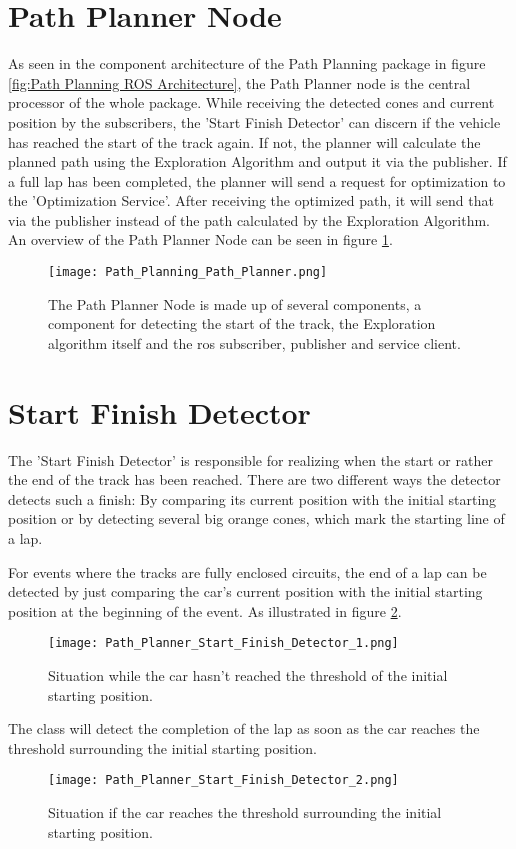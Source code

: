 \section{Path Planner Node} \label{sec:Path Planner Node}
As seen in the component architecture of the Path Planning package in figure \ref{fig:Path Planning ROS Architecture}, the Path Planner node is the central processor of the whole package.
While receiving the detected cones and current position by the subscribers, the 'Start Finish Detector' can discern if the vehicle has reached the start of the track again. If not, the planner will calculate the planned path using the Exploration Algorithm and output it via the publisher. If a full lap has been completed, the planner will send a request for optimization to the 'Optimization Service'. After receiving the optimized path, it will send that via the publisher instead of the path calculated by the Exploration Algorithm. An overview of the Path Planner Node can be seen in figure \ref{fig:Path Planning Path Planner Node}.
\begin{figure}[H]
    \centering
    \texttt{[image: Path\_Planning\_Path\_Planner.png]}
    \caption{The Path Planner Node is made up of several components, a component for detecting the start of the track, the Exploration algorithm itself and the \acrshort{ros} subscriber, publisher and service client.}
    \label{fig:Path Planning Path Planner Node}
\end{figure}

\section{Start Finish Detector} \label{sec:Start Finish Detector}
The 'Start Finish Detector' is responsible for realizing when the start or rather the end of the track has been reached. There are two different ways the detector detects such a finish: By comparing its current position with the initial starting position or by detecting several big orange cones, which mark the starting line of a lap.

For events where the tracks are fully enclosed circuits, the end of a lap can be detected by just comparing the car's current position with the initial starting position at the beginning of the event. As illustrated in figure \ref{fig:Path Planner Start Finish Detector 1}.
\begin{figure}[H]
    \centering
    \texttt{[image: Path\_Planner\_Start\_Finish\_Detector\_1.png]}
    \caption{Situation while the car hasn't reached the threshold of the initial starting position.}
    \label{fig:Path Planner Start Finish Detector 1}
\end{figure}
The class will detect the completion of the lap as soon as the car reaches the threshold surrounding the initial starting position.
\begin{figure}[H]
    \centering
    \texttt{[image: Path\_Planner\_Start\_Finish\_Detector\_2.png]}
    \caption{Situation if the car reaches the threshold surrounding the initial starting position.}
    \label{fig:Path Planner Start Finish Detector 2}
\end{figure}

